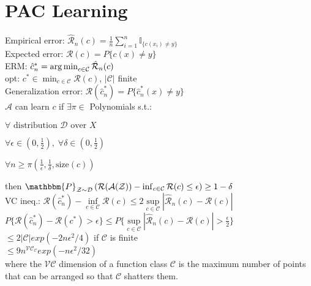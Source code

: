 \section{PAC Learning}
Empirical error: $\hat{\mathcal{R}}_n(c) = \tfrac{1}{n}\sum_{i=1}^n \mathbb{I}_{\{c(x_i)\neq y\}}$ \\
Expected error: $\mathcal{R}(c) = P\{c(x)\neq y\}$ \\
ERM: $\hat{c}_n^* = \operatorname*{arg\,min}_{c\in\mathcal{C}} \hat{\mathcal{R}}_n(c)$ \\
opt: $c^* \in \min_{c\in\mathcal{C}} \mathcal{R}(c)$, $|\mathcal{C}|$ finite \\
Generalization error: $\mathcal{R}(\hat{c}_n^*) = P\{ \hat{c}_n^*(x)\neq y \}$ \\
$\mathcal{A}$ can learn $c$ if $\exists \pi \in$ Polynomials s.t.:\\
\begin{inparaitem}[\color{red}\textbullet]
    \item $\forall \text{ distribution } \mathcal{D} \text{ over } X$ \\
    \item $\forall \epsilon \in (0, \frac{1}{2}),\;\forall \delta \in (0, \frac{1}{2})$ \\
    \item $\forall n \geq \pi(\frac{1}{\epsilon}, \frac{1}{\delta}, \text{size}(c))$\\
\end{inparaitem}
then $\mathbbm{P}_{\mathcal{Z}\sim\mathcal{D}}\left(\mathcal{R}(\mathcal{A}(\mathcal{Z}))- \inf_{c\in \mathcal{C}}\mathcal{R}(c)\leq \epsilon\right)\geq 1-\delta$\\

VC ineq.: $\mathcal{R}(\hat{c}_n^*) - \inf\limits_{c\in\mathcal{C}}\mathcal{R}(c) \leq 2\sup\limits_{c\in\mathcal{C}}|\hat{\mathcal{R}}_n(c) - \mathcal{R}(c)|$ \\ 
$P\{ \mathcal{R}(\hat{c}_n^*) - \mathcal{R}(c^*) > \epsilon \} \leq P\{ \sup\limits_{c\in\mathcal{C}}|\hat{\mathcal{R}}_n(c) - \mathcal{R}(c)| > \frac{\epsilon}{2} \} $\\
$\leq 2|\mathcal{C}| exp(-2n\epsilon ^2 /4) $ if $\mathcal{C}$ is finite\\
$\leq 9n^{\mathcal{VC}_{\mathcal{C}}}exp(-n\epsilon ^{2} /32)$ \\
where the $\mathcal{VC}$ dimension of a function class $\mathcal{C}$ 
is the maximum number of points that can be arranged so that $\mathcal{C}$ shatters them.
